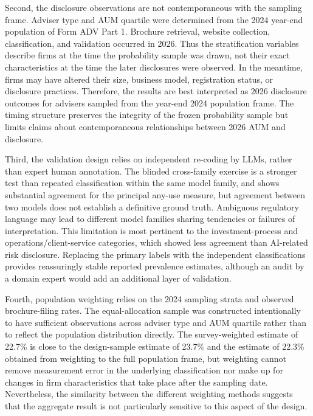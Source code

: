 \documentclass[utf8]{FrontiersinHarvard}
\begin{document}
Second, the disclosure observations are not contemporaneous with the sampling frame. Adviser type and AUM quartile were determined from the 2024 year-end population of Form ADV Part 1. Brochure retrieval, website collection, classification, and validation occurred in 2026. Thus the stratification variables describe firms at the time the probability sample was drawn, not their exact characteristics at the time the later disclosures were observed. In the meantime, firms may have altered their size, business model, registration status, or disclosure practices. Therefore, the results are best interpreted as 2026 disclosure outcomes for advisers sampled from the year-end 2024 population frame. The timing structure preserves the integrity of the frozen probability sample but limits claims about contemporaneous relationships between 2026 AUM and disclosure.

Third, the validation design relies on independent re-coding by LLMs, rather than expert human annotation. The blinded cross-family exercise is a stronger test than repeated classification within the same model family, and shows substantial agreement for the principal any-use measure, but agreement between two models does not establish a definitive ground truth. Ambiguous regulatory language may lead to different model families sharing tendencies or failures of interpretation. This limitation is most pertinent to the investment-process and operations/client-service categories, which showed less agreement than AI-related risk disclosure. Replacing the primary labels with the independent classifications provides reassuringly stable reported prevalence estimates, although an audit by a domain expert would add an additional layer of validation.

Fourth, population weighting relies on the 2024 sampling strata and observed brochure-filing rates. The equal-allocation sample was constructed intentionally to have sufficient observations across adviser type and AUM quartile rather than to reflect the population distribution directly. The survey-weighted estimate of 22.7\% is close to the design-sample estimate of 23.7\% and the estimate of 22.3\% obtained from weighting to the full population frame, but weighting cannot remove measurement error in the underlying classification nor make up for changes in firm characteristics that take place after the sampling date. Nevertheless, the similarity between the different weighting methods suggests that the aggregate result is not particularly sensitive to this aspect of the design.
\end{document}
